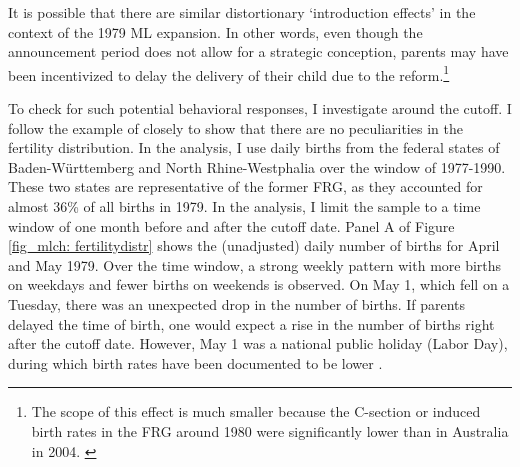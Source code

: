 It is possible that there are similar distortionary `introduction effects' in the context of the 1979 ML expansion. In other words, even though the announcement period does not allow for a strategic conception, parents may have been incentivized to delay the delivery of their child due to the reform.\footnote{The scope of this effect is much smaller because the C-section or induced birth rates in the FRG around 1980 were significantly lower than in Australia in 2004. \label{rev_mlch: footnote_csections_germany}}


To check for such potential behavioral responses, I investigate  around the cutoff. I follow the example of \cite{gans2009born} closely to show that there are no peculiarities in the fertility distribution. In the analysis, I use daily births from the federal states of Baden-Württemberg and North Rhine-Westphalia over the window of 1977-1990. These two states are representative of the former FRG, as they accounted for almost 36\% of all births in 1979. In the analysis, I limit the sample to a time window of one month before and after the cutoff date. Panel A of Figure \ref{fig_mlch: fertilitydistr} shows the (unadjusted) daily number of births for April and May 1979. Over the time window, a strong weekly pattern with more births on weekdays and fewer births on weekends is observed. On May 1, which fell on a Tuesday, there was an unexpected drop in the number of births. If parents delayed the time of birth, one would expect a rise in the number of births right after the cutoff date. However, May 1 was a national public holiday (Labor Day), during which birth rates have been documented to be lower \citep{neugart2013economic}.


